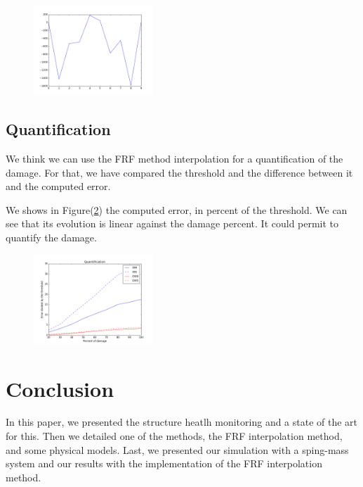 \documentclass[journal]{IEEEtran}
\begin{document}
\begin{figure}[h!]
  \centering
  \includegraphics[width=0.4\textwidth]{images/poutre_error.png}
  \caption{}
  \label{beam_error}
\end{figure}



\subsection{Quantification}

We think we can use the FRF method interpolation for a quantification of the damage. For that, we have compared the threshold and the difference between it and the computed error.

We shows in Figure(\ref{quant}) the computed error, in percent of the threshold. We can see that its evolution is linear against the damage percent.
It could permit to quantify the damage.

\begin{figure}[h!]
  \centering
  \includegraphics[width=0.4\textwidth]{images/quantification.png}
  \caption{}
  \label{quant}
\end{figure}


\section{Conclusion}

In this paper, we presented the structure heatlh monitoring and a state of the art for this. Then we detailed one of the methods, the FRF interpolation method, and some physical models. Last, we presented our simulation with a sping-mass system and our results with the implementation of the FRF interpolation method.
\end{document}
